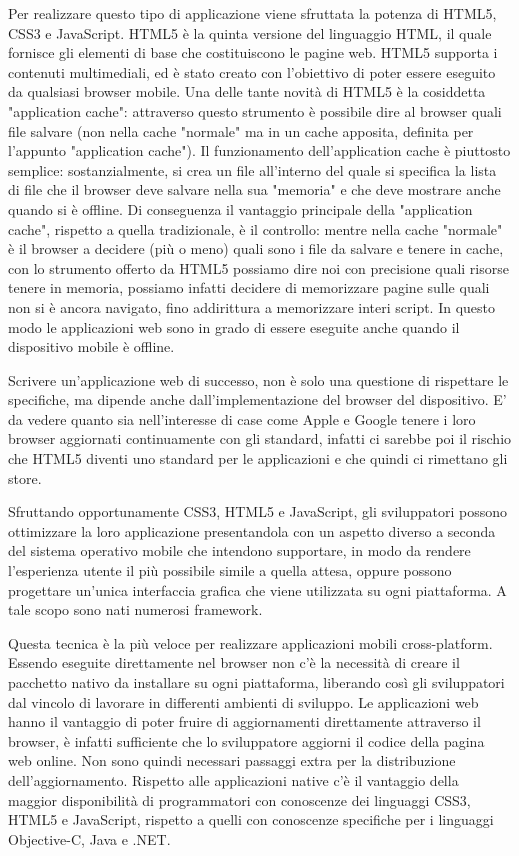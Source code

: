 		Per realizzare questo tipo di applicazione viene sfruttata la potenza di HTML5, CSS3 e JavaScript. HTML5 è la quinta versione del linguaggio HTML, il quale fornisce gli elementi di base che costituiscono le pagine web. HTML5 supporta i contenuti multimediali, ed è stato creato con l'obiettivo di poter essere eseguito da qualsiasi browser mobile.
		Una delle tante novità di HTML5 è la cosiddetta "application cache": attraverso questo strumento è possibile dire al browser quali file salvare (non nella cache "normale" ma in un cache apposita, definita per l'appunto "application cache").
		Il funzionamento dell'application cache è piuttosto semplice: sostanzialmente, si crea un file all'interno del quale si specifica la lista di file che il browser deve salvare nella sua "memoria" e che deve mostrare anche quando si è offline.
		Di conseguenza il vantaggio principale della "application cache", rispetto a quella tradizionale, è il controllo: mentre nella cache "normale" è il browser a decidere (più o meno) quali sono i file da salvare e tenere in cache, con lo strumento offerto da HTML5 possiamo dire noi con precisione quali risorse tenere in memoria, possiamo infatti decidere di memorizzare pagine sulle quali non si è ancora navigato, fino addirittura a memorizzare interi script. In questo modo le applicazioni web sono in grado di essere eseguite anche quando il dispositivo mobile è offline.

Scrivere un'applicazione web di successo, non è solo una questione di rispettare le specifiche, ma dipende anche dall'implementazione del browser del dispositivo. E' da vedere quanto sia nell'interesse di case come Apple e Google tenere i loro browser aggiornati continuamente con gli standard, infatti ci sarebbe poi il rischio che HTML5 diventi uno standard per le applicazioni e che quindi ci rimettano gli store\citep{White:Native-vs-Html}. 

Sfruttando opportunamente CSS3, HTML5 e JavaScript, gli sviluppatori possono ottimizzare la loro applicazione presentandola con un aspetto diverso a seconda del sistema operativo mobile che intendono supportare, in modo da rendere l'esperienza utente il più possibile simile a quella attesa, oppure possono progettare un'unica interfaccia grafica che viene utilizzata su ogni piattaforma. A tale scopo sono nati numerosi framework.%

Questa tecnica è la più veloce per realizzare applicazioni mobili cross-platform. Essendo eseguite direttamente nel browser non c'è la necessità di creare il pacchetto nativo da installare su ogni piattaforma, liberando così gli sviluppatori dal vincolo di lavorare in differenti ambienti di sviluppo. Le applicazioni web hanno il vantaggio di poter fruire di aggiornamenti direttamente attraverso il browser, è infatti sufficiente che lo sviluppatore aggiorni il codice della pagina web online. Non sono quindi necessari passaggi extra per la distribuzione dell'aggiornamento.
Rispetto alle applicazioni native c'è il vantaggio della maggior disponibilità di programmatori con conoscenze dei linguaggi CSS3, HTML5 e JavaScript, rispetto a quelli con conoscenze specifiche per i linguaggi Objective-C, Java e .NET.

